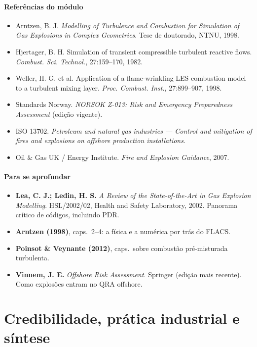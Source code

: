 \documentclass[10pt,a4paper,twocolumn,openany]{report}
\newenvironment{refs}{\subsection*{Referências do módulo}\small}{\par}
\newenvironment{aprofundar}{\subsection*{\textcolor{amarelo}{Para se aprofundar}}\small}{\par}
\begin{document}
\begin{refs}
\begin{itemize}
  \item Arntzen, B. J. \emph{Modelling of Turbulence and Combustion for Simulation of Gas Explosions in Complex Geometries}. Tese de doutorado, NTNU, 1998.
  \item Hjertager, B. H. Simulation of transient compressible turbulent reactive flows. \emph{Combust. Sci. Technol.}, 27:159--170, 1982.
  \item Weller, H. G. et al. Application of a flame-wrinkling LES combustion model to a turbulent mixing layer. \emph{Proc. Combust. Inst.}, 27:899--907, 1998.
  \item Standards Norway. \emph{NORSOK Z-013: Risk and Emergency Preparedness Assessment} (edição vigente).
  \item ISO 13702. \emph{Petroleum and natural gas industries --- Control and mitigation of fires and explosions on offshore production installations}.
  \item Oil \& Gas UK / Energy Institute. \emph{Fire and Explosion Guidance}, 2007.
\end{itemize}
\end{refs}

\begin{aprofundar}
\begin{itemize}[leftmargin=*]
  \item \textbf{Lea, C. J.; Ledin, H. S.} \emph{A Review of the State-of-the-Art in Gas Explosion Modelling}. HSL/2002/02, Health and Safety Laboratory, 2002. Panorama crítico de códigos, incluindo PDR.
  \item \textbf{Arntzen (1998)}, caps.\ 2--4: a física e a numérica por trás do FLACS.
  \item \textbf{Poinsot \& Veynante (2012)}, caps.\ sobre combustão pré-misturada turbulenta.
  \item \textbf{Vinnem, J. E.} \emph{Offshore Risk Assessment}. Springer (edição mais recente). Como explosões entram no QRA offshore.
\end{itemize}
\end{aprofundar}

\part{Credibilidade, prática industrial e síntese}
\end{document}
